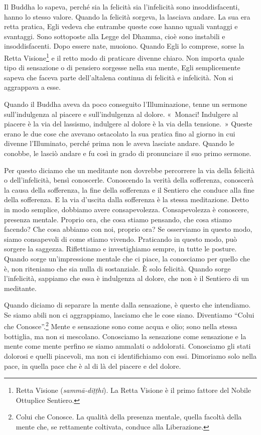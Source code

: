 Il Buddha lo sapeva, perché sia la felicità sia l'infelicità sono
insoddisfacenti, hanno lo stesso valore. Quando la felicità sorgeva, la
lasciava andare. La sua era retta pratica, Egli vedeva che entrambe
queste cose hanno uguali vantaggi e svantaggi. Sono sottoposte alla
Legge del Dhamma, cioè sono instabili e insoddisfacenti. Dopo essere
nate, muoiono. Quando Egli lo comprese, sorse la Retta Visione\footnote{Retta
  Visione (\emph{sammā-diṭṭhi}). La Retta Visione è il primo fattore del
  Nobile Ottuplice Sentiero.} e il retto modo di praticare divenne
chiaro. Non importa quale tipo di sensazione o di pensiero sorgesse
nella sua mente, Egli semplicemente sapeva che faceva parte
dell'altalena continua di felicità e infelicità. Non si aggrappava a
esse.

Quando il Buddha aveva da poco conseguito l'Illuminazione, tenne un
sermone sull'indulgenza al piacere e sull'indulgenza al dolore.
«~Monaci! Indulgere al piacere è la via del lassismo, indulgere al
dolore è la via della tensione.~» Queste erano le due cose che avevano
ostacolato la sua pratica fino al giorno in cui divenne l'Illuminato,
perché prima non le aveva lasciate andare. Quando le conobbe, le lasciò
andare e fu così in grado di pronunciare il suo primo sermone.

Per questo diciamo che un meditante non dovrebbe percorrere la via della
felicità o dell'infelicità, bensì conoscerle. Conoscendo la verità della
sofferenza, conoscerà la causa della sofferenza, la fine della
sofferenza e il Sentiero che conduce alla fine della sofferenza. E la
via d'uscita dalla sofferenza è la stessa meditazione. Detto in modo
semplice, dobbiamo avere consapevolezza. Consapevolezza è conoscere,
presenza mentale. Proprio ora, che cosa stiamo pensando, che cosa stiamo
facendo? Che cosa abbiamo con noi, proprio ora? Se osserviamo in questo
modo, siamo consapevoli di come stiamo vivendo. Praticando in questo
modo, può sorgere la saggezza. Riflettiamo e investighiamo sempre, in
tutte le posture. Quando sorge un'impressione mentale che ci piace, la
conosciamo per quello che è, non riteniamo che sia nulla di sostanziale.
È solo felicità. Quando sorge l'infelicità, sappiamo che essa è
indulgenza al dolore, che non è il Sentiero di un meditante.

Quando diciamo di separare la mente dalla sensazione, è questo che
intendiamo. Se siamo abili non ci aggrappiamo, lasciamo che le cose
siano. Diventiamo ``Colui che Conosce''.\footnote{Colui che Conosce. La
  qualità della presenza mentale, quella facoltà della mente che, se
  rettamente coltivata, conduce alla Liberazione.} Mente e sensazione
sono come acqua e olio; sono nella stessa bottiglia, ma non si
mescolano. Conosciamo la sensazione come sensazione e la mente come
mente perfino se siamo ammalati o addolorati. Conosciamo gli stati
dolorosi e quelli piacevoli, ma non ci identifichiamo con essi.
Dimoriamo solo nella pace, in quella pace che è al di là del piacere e
del dolore.

